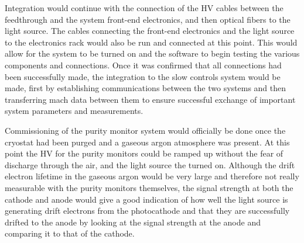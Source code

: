 Integration would continue with the connection of the HV cables between the feedthrough and the system front-end electronics, and then optical fibers to the light source.  The cables connecting the front-end electronics and the light source to the electronics rack would also be run and connected at this point.  This would allow for the system to be turned on and the software to begin testing the various components and connections.  Once it was confirmed that all connections had been successfully made, the integration to the slow controls system would be made, first by establishing communications between the two systems and then transferring mach data between them to ensure successful exchange of important system parameters and measurements.  

Commissioning of the purity monitor system would officially be done once the cryostat had been purged and a gaseous argon atmosphere was present.  At this point the HV for the purity monitors could be ramped up without the fear of discharge through the air, and the light source the turned on.  Although the drift electron lifetime in the gaseous argon would be very large and therefore not really measurable with the purity monitors themselves, the signal strength at both the cathode and anode would give a good indication of how well the light source is generating drift electrons from the photocathode and that they are successfully drifted to the anode by looking at the signal strength at the anode and comparing it to that of the cathode.





